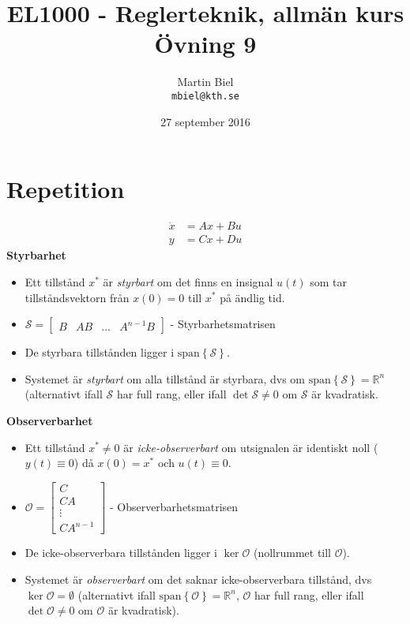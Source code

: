 \documentclass[12pt]{article}
\newcommand{\sspan}[1]{\mathrm{span}\left\{#1\right\}}
\begin{document}
\begin{titlepage}
\author{Martin Biel \\ \texttt{mbiel@kth.se}}
\title{EL1000 - Reglerteknik, allmän kurs \\ \Large Övning 9}
\date{27 september 2016}
\end{titlepage}

\maketitle

\section*{Repetition}
\begin{align*}
  \dot{x} &= Ax + Bu \\
  y &= Cx + Du
\end{align*}
\textbf{Styrbarhet} \\
\begin{itemize}
\item Ett tillstånd $x^*$ är \emph{styrbart} om det finns en insignal $u(t)$ som tar tillståndsvektorn från $x(0) = 0$ till $x^*$ på ändlig tid.
\item $\mathcal{S} =
  \begin{bmatrix}
    B & AB & \dots & A^{n-1}B
  \end{bmatrix}$ - Styrbarhetsmatrisen
\item De styrbara tillstånden ligger i $\sspan{\mathcal{S}}$.
\item Systemet är \emph{styrbart} om alla tillstånd är styrbara, dvs om $\sspan{\mathcal{S}} = \mathbb{R}^n$ (alternativt ifall $\mathcal{S}$ har full rang, eller ifall $\det{\mathcal{S}} \neq 0$ om $\mathcal{S}$ är kvadratisk.
\end{itemize}
\textbf{Observerbarhet}
\begin{itemize}
\item Ett tillstånd $x^* \neq 0$ är \emph{icke-observerbart} om utsignalen är identiskt noll ($y(t) \equiv 0$) då $x(0) = x^*$ och $u(t) \equiv 0$.
\item $\mathcal{O} =
  \begin{bmatrix}
    C \\
    CA \\
    \vdots \\
    CA^{n-1}
  \end{bmatrix}$ - Observerbarhetsmatrisen
\item De icke-observerbara tillstånden ligger i $\ker{\mathcal{O}}$ (nollrummet till $\mathcal{O}$).
\item Systemet är \emph{observerbart} om det saknar icke-observerbara tillstånd, dvs $\ker{\mathcal{O}} = \emptyset$ (alternativt ifall $\sspan{\mathcal{O}} = \mathbb{R}^n$, $\mathcal{O}$ har full rang, eller ifall $\det{\mathcal{O}} \neq 0$ om $\mathcal{O}$ är kvadratisk).
\end{itemize}
\end{document}
